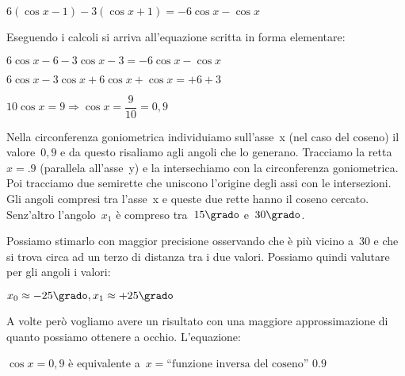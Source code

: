  \begin{esempio}
  \(6 ( \cos x -1) -3 ( \cos x +1) = -6 \cos x - \cos x\)
  
  Eseguendo i calcoli si arriva all'equazione scritta in forma elementare:
  
  \(6 \cos x -6 -3 \cos x -3 = -6 \cos x - \cos x\)
  
  \(6 \cos x -3 \cos x +6 \cos x + \cos x = +6 +3\)
  
  \(10 \cos x= 9 \Rightarrow \cos x = \dfrac{9}{10} = 0,9\)


 \vspace{-6pt}
 \begin{minipage}{.50\textwidth}
Nella circonferenza goniometrica individuiamo sull'asse~x (nel caso del 
coseno) il valore~\(0,9\) e da questo risaliamo agli angoli che lo generano.
Tracciamo la retta~\(x=.9\) (parallela all'asse~y) e la intersechiamo con
la circonferenza goniometrica. Poi tracciamo due semirette che uniscono 
l'origine degli assi con le intersezioni. Gli angoli compresi tra l'asse~x 
e queste due rette hanno il coseno cercato. Senz'altro l'angolo~\(x_1\) è 
compreso tra~\(15\grado\) e~\(30\grado\).

Possiamo stimarlo con maggior precisione osservando che è più vicino a~\(30\) 
e che si trova circa ad un terzo di distanza tra i due valori. 
Possiamo quindi valutare per gli angoli i valori:

\(x_0 \approx -25\grado, x_1 \approx +25\grado\)
 \end{minipage}
 \begin{minipage}{.45\textwidth}
  \begin{center}
\begin{inaccessibleblock}[Soluzione grafica approssimata dell'equazione: 
    \(\cos x = 0,8\).]
    
\end{inaccessibleblock}
  \end{center}
 \end{minipage}
 
 \end{esempio}

A volte però vogliamo avere un risultato con una maggiore approssimazione di 
quanto possiamo ottenere a occhio. L'equazione:
\begin{center}
\(\cos x = 0,9\) è equivalente 
a~\(x = \text{``funzione inversa del coseno'' } 0.9\)
\end{center}

